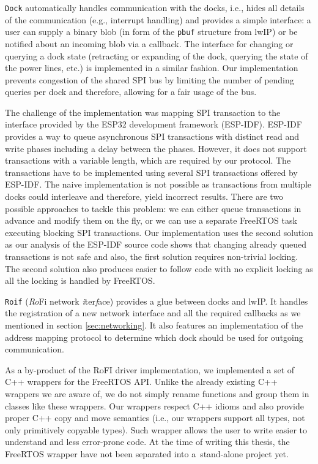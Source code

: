 \texttt{Dock} automatically handles communication with the docks, i.e., hides
all details of the communication (e.g., interrupt handling) and provides a
simple interface: a user can supply a binary blob (in form of the \texttt{pbuf}
structure from lwIP) or be notified about an incoming blob via a callback. The
interface for changing or querying a dock state (retracting or expanding of the
dock, querying the state of the power lines, etc.) is implemented in a similar
fashion. Our implementation prevents congestion of the shared SPI bus by
limiting the number of pending queries per dock and therefore, allowing for a
fair usage of the bus.

The challenge of the implementation was mapping SPI transaction to the interface
provided by the ESP32 development framework (ESP-IDF). ESP-IDF provides a way to
queue asynchronous SPI transactions with distinct read and write phases
including a delay between the phases. However, it does not support transactions
with a variable length, which are required by our protocol. The transactions have
to be implemented using several SPI transactions offered by ESP-IDF. The naive
implementation is not possible as transactions from multiple docks could
interleave and therefore, yield incorrect results. There are two possible
approaches to tackle this problem: we can either queue transactions in advance
and modify them on the fly, or we can use a separate FreeRTOS task executing
blocking SPI transactions. Our implementation uses the second solution as our
analysis of the ESP-IDF source code shows that changing already queued
transactions is not safe and also, the first solution requires non-trivial
locking. The second solution also produces easier to follow code with no
explicit locking as all the locking is handled by FreeRTOS.

\texttt{Roif} (\emph{Ro}Fi network \emph{i}ter\emph{f}ace) provides a glue
between docks and lwIP. It handles the registration of a new network interface
and all the required callbacks as we mentioned in section \ref{sec:networking}.
It also features an implementation of the address mapping protocol to determine
which dock should be used for outgoing communication.

As a by-product of the RoFI driver implementation, we implemented a set of C++
wrappers for the FreeRTOS API. Unlike the already existing C++ wrappers we are
aware of, we do not simply rename functions and group them in classes like these
wrappers. Our wrappers respect C++ idioms and also provide proper C++ copy and
move semantics (i.e., our wrappers support all types, not only primitively
copyable types). Such wrapper allows the user to write easier to understand and
less error-prone code. At the time of writing this thesis, the FreeRTOS wrapper
have not been separated into a~stand-alone project yet.

